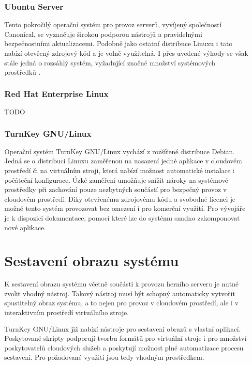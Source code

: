 \subsubsection{Ubuntu Server}

Tento pokročilý operační systém pro provoz serverů, vyvíjený společností Canonical, se vyznačuje širokou podporou nástrojů a pravidelnými bezpečnostními
aktualizacemi. Podobně jako ostatní distribuce Linuxu i tato nabízí otevřený zdrojový kód a je volně využitelná. I přes uvedené výhody se však stále jedná o
rozsáhlý systém, vyžadující značné množství systémových prostředků \cite{ubuntu_server_reqs}.

\subsubsection{Red Hat Enterprise Linux}

TODO

\subsubsection{TurnKey GNU/Linux}

Operační systém TurnKey GNU/Linux vychází z rozšířené distribuce Debian. Jedná se o distribuci Linuxu zaměřenou na nasazení jedné aplikace v cloudovém prostředí
či na virtuálním stroji, která nabízí možnost automatické instalace i počáteční konfigurace. Úzké zaměření umožňuje snížit nároky na systémové prostředky
při zachování pouze nezbytných součástí pro bezpečný provoz v cloudovém prostředí. Díky otevřenému zdrojovému kódu a svobodné licenci je možné
tento systém provozovat bez omezení i pro komerční využití. Pro vývojáře je k dispozici dokumentace, pomocí které lze do systému snadno zakomponovat
nové aplikace.

\section{Sestavení obrazu systému}

K sestavení obrazu systému včetně součásti k provozu herního serveru je nutné zvolit vhodný nástroj. Takový nástroj
musí být schopný automaticky vytvořit spustitelný obraz systému, a to nejen pro provoz v cloudovém prostředí, ale i
v interaktivním prostředí virtuálního stroje.

TurnKey GNU/Linux již nabízí nástroje pro sestavení obrazů s vlastní aplikací. Poskytované skripty podporují tvorbu formátů
pro virtuální stroje i pro množství poskytovatelů cloudových služeb a poskytují možnost plné automatizace procesu sestavení.
Pro požadované využití jsou tedy vhodným prostředkem.

